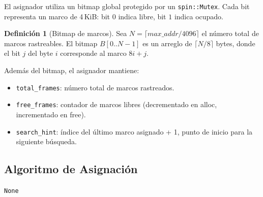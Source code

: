 \documentclass[11pt,twoside,openright]{book}
\theoremstyle{definition}
\newtheorem{definition}{Definición}[chapter]
\theoremstyle{plain}
\theoremstyle{remark}
\begin{document}
El asignador utiliza un bitmap global protegido por un \texttt{spin::Mutex}.
Cada bit representa un marco de 4\,KiB: bit $0$ indica libre, bit $1$ indica
ocupado.

\begin{definition}[Bitmap de marcos]
Sea $N = \lceil \textit{max\_addr} / 4096 \rceil$ el número total de marcos
rastreables. El bitmap $B[0..N-1]$ es un arreglo de $\lceil N/8 \rceil$ bytes,
donde el bit $j$ del byte $i$ corresponde al marco $8i + j$.
\end{definition}

Además del bitmap, el asignador mantiene:
\begin{itemize}
    \item \texttt{total\_frames}: número total de marcos rastreados.
    \item \texttt{free\_frames}: contador de marcos libres (decrementado en alloc, incrementado en free).
    \item \texttt{search\_hint}: índice del último marco asignado + 1, punto de inicio para la siguiente búsqueda.
\end{itemize}

\subsection{Algoritmo de Asignación}

\begin{algorithm}[H]
\caption{\textsc{Frame-Alloc}: Asignación de un marco físico}
\label{alg:frame-alloc}
\Return \texttt{None} 
\end{algorithm}
\end{document}
